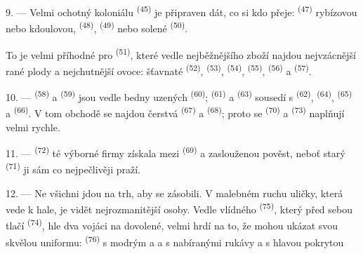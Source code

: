 9. --- Velmi ochotný  koloniálu \textsuperscript{(45)} je připraven
dát, co si kdo přeje:  \textsuperscript{(47)} rybízovou nebo
kdoulovou,  \textsuperscript{(48)}, 
\textsuperscript{(49)} nebo solené  \textsuperscript{(50)}.

To je velmi příhodné pro  \textsuperscript{(51)}, které vedle
nejběžnějšího zboží najdou nejvzácnější rané plody a nejchutnější ovoce: šťavnaté
 \textsuperscript{(52)},  \textsuperscript{(53)},
 \textsuperscript{(54)},  \textsuperscript{(55)},
 \textsuperscript{(56)} a  \textsuperscript{(57)}.

\VUsaut{4.0mm}
\VUsaut{3.0mm}

10. ---  \textsuperscript{(58)} a  \textsuperscript{(59)}
jsou vedle bedny uzených  \textsuperscript{(60)}; 
\textsuperscript{(61)} a  \textsuperscript{(63)} sousedí s
 \textsuperscript{(62)},  \textsuperscript{(64)},
 \textsuperscript{(65)} a 
\textsuperscript{(66)}. V tom obchodě se najdou čerstvá 
\textsuperscript{(67)} a  \textsuperscript{(68)}; proto se 
\textsuperscript{(70)} a  \textsuperscript{(73)} naplňují velmi
rychle.

11. ---  \textsuperscript{(72)} té výborné firmy získala mezi
 \textsuperscript{(69)} a  zaslouženou pověst,
neboť starý  \textsuperscript{(71)} ji sám co nejpečlivěji praží.

\VUsaut{4.0mm}
\VUsaut{3.0mm}

12. --- Ne všichni jdou na trh, aby se zásobili. V malebném ruchu uličky, která vede k
hale, je vidět nejrozmanitější osoby. Vedle vlídného 
\textsuperscript{(75)}, který před sebou tlačí 
\textsuperscript{(74)}, hle dva vojáci na dovolené, velmi hrdí na to, že mohou ukázat
svou skvělou uniformu:  \textsuperscript{(76)} s modrým
 a  a  s
nabíranými rukávy a s hlavou pokrytou 

